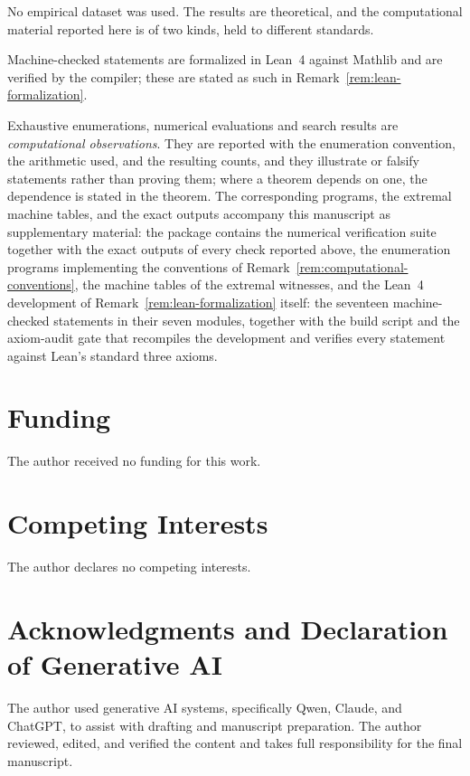 \documentclass[12pt]{article}
\theoremstyle{definition}
\begin{document}
No empirical dataset was used.  The results are theoretical, and the
computational material reported here is of two kinds, held to different
standards.

Machine-checked statements are formalized in Lean~4 against Mathlib and are
verified by the compiler; these are stated as such in
Remark~\ref{rem:lean-formalization}.

Exhaustive enumerations, numerical evaluations and search results are
\emph{computational observations}.  They are reported with the enumeration
convention, the arithmetic used, and the resulting counts, and they illustrate
or falsify statements rather than proving them; where a theorem depends on one,
the dependence is stated in the theorem.  The corresponding programs, the
extremal machine tables, and the exact outputs accompany this manuscript as
supplementary material: the package contains the numerical verification
suite together with the exact outputs of every check reported above, the
enumeration programs implementing the conventions of
Remark~\ref{rem:computational-conventions}, the machine tables of the
extremal witnesses, and the Lean~4 development of
Remark~\ref{rem:lean-formalization} itself: the seventeen machine-checked
statements in their seven modules, together with the build script and the
axiom-audit gate that recompiles the development and verifies every statement
against Lean's standard three axioms.

\section*{Funding}

The author received no funding for this work.

\section*{Competing Interests}

The author declares no competing interests.

\section*{Acknowledgments and Declaration of Generative AI}

The author used generative AI systems, specifically Qwen, Claude, and
ChatGPT, to assist with drafting and manuscript preparation.  The author
reviewed, edited, and verified the content and takes full responsibility for
the final manuscript.
\end{document}
